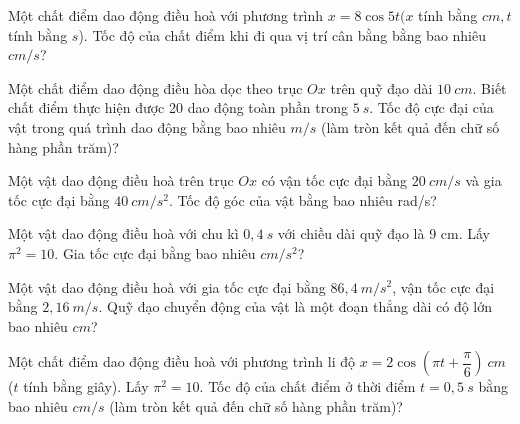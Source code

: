\setcounter{ex}{0}
\PhanIII
\begin{ex}
Một chất điểm dao động điều hoà với phương trình $x=8 \cos 5 t(x$ tính bằng $cm, t$ tính bằng $s$). Tốc độ của chất điểm khi đi qua vị trí cân bằng bằng bao nhiêu $cm/s$?
\end{ex} 
\begin{ex}
Một chất điểm dao động điều hòa dọc theo trục $O x$ trên quỹ đạo dài $10 \ cm$. Biết chất điểm thực hiện được 20 dao động toàn phần trong $5 \ s$. Tốc độ cực đại của vật trong quá trình dao động bằng bao nhiêu $m/s$ (làm tròn kết quả đến chữ số hàng phần trăm)?
\end{ex} 
\begin{ex}
Một vật dao động điều hoà trên trục $O x$ có vận tốc cực đại bằng $20 \ cm/s$ và gia tốc cực đại bằng $40\ cm/s^2$. Tốc độ góc của vật bằng bao nhiêu rad/s?
\end{ex} 
\begin{ex}
Một vật dao động điều hoà với chu kì $0,4\ s$ với chiều dài quỹ đạo là 9 cm. Lấy $\pi^2=10$. Gia tốc cực đại bằng bao nhiêu $cm/s^2$?
\end{ex} 
\begin{ex}
Một vật dao động điều hoà với gia tốc cực đại bằng $86,4 \ m/s^2$, vận tốc cực đại bằng $2,16 \ m/s$. Quỹ đạo chuyển động của vật là một đoạn thẳng dài có độ lớn bao nhiêu $cm$?
\end{ex} 
\begin{ex}
Một chất điểm dao động điều hoà với phương trình li độ $x=2 \cos \left(\pi t+\dfrac{\pi}{6}\right)\ cm$ ($t$ tính bằng giây). Lấy $\pi^2=10$. Tốc độ của chất điểm ở thời điểm $t=0,5 \ s$ bằng bao nhiêu $cm/s$ (làm tròn kết quả đến chữ số hàng phần trăm)?
\end{ex} 